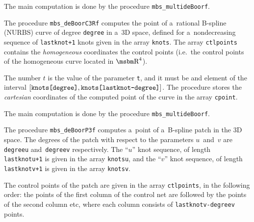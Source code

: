 The main computation is done by the procedure \texttt{mbs\_multideBoorf}.

\vspace{\bigskipamount}
\begin{sloppypar}
The procedure \texttt{mbs\_deBoorC3Rf} computes the point of a~rational
B-spline (NURBS) curve of degree \texttt{degree} in a~$3$D space, defined for
a~nondecreasing sequence of \texttt{lastknot+1} knots given in the array
\texttt{knots}. The array \texttt{ctlpoints} contains the \emph{homogeneous}
coordinates the control points (i.e.\ the control points of the homogeneous curve
located in $\R^4$).

The number $t$ is the value of the parameter \texttt{t}, and it must be
and element of the interval
$[\mbox{\texttt{knots[degree]}},\mbox{\texttt{knots[lastknot-degree]}}]$.
The procedure stores the \emph{cartesian} coordinates of the computed point
of the curve in the array \texttt{cpoint}.
\end{sloppypar}

The main computation is done by the procedure \texttt{mbs\_multideBoorf}.

\vspace{\bigskipamount}
The procedure \texttt{mbs\_deBoorP3f} computes a~point of a~B-spline patch
in the $3$D space. The degrees of the patch with respect to the parameters
$u$~and~$v$ are \texttt{degreeu} and~\texttt{degreev} respectively.
The ``$u$'' knot sequence, of length \texttt{lastknotu+1} is given in the array
\texttt{knotsu}, and the ``$v$'' knot sequence, of length
\texttt{lastknotv+1} is given in the array \texttt{knotsv}.

The control points of the patch are given in the array \texttt{ctlpoints}, in
the following order: the points of the first column of the control net are
followed by the points of the second column etc, where each column consists of
\texttt{lastknotv-degreev} points.

